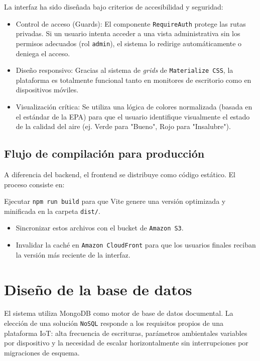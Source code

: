 La interfaz ha sido diseñada bajo criterios de accesibilidad y seguridad:

\begin{itemize}
    \item Control de acceso (Guards): El componente \texttt{RequireAuth} protege las rutas privadas. Si un usuario intenta acceder a una vista administrativa sin los permisos adecuados (rol \texttt{admin}), el sistema lo redirige automáticamente o deniega el acceso.
    \item Diseño responsivo: Gracias al sistema de \textit{grids} de \texttt{Materialize CSS}, la plataforma es totalmente funcional tanto en monitores de escritorio como en dispositivos móviles.
    \item Visualización crítica: Se utiliza una lógica de colores normalizada (basada en el estándar de la EPA) para que el usuario identifique visualmente el estado de la calidad del aire (ej. Verde para "Bueno", Rojo para "Insalubre").
\end{itemize}

\subsection{Flujo de compilación para producción}

A diferencia del backend, el frontend se distribuye como código estático. El proceso consiste en:

Ejecutar \texttt{npm run build} para que Vite genere una versión optimizada y minificada en la carpeta \texttt{dist/}.

\begin{itemize}
    \item Sincronizar estos archivos con el bucket de \texttt{Amazon S3}.
    \item Invalidar la caché en \texttt{Amazon CloudFront} para que los usuarios finales reciban la versión más reciente de la interfaz.
\end{itemize}


\section{Diseño de la base de datos}

El sistema utiliza MongoDB como motor de base de datos documental. La elección de una solución \texttt{NoSQL} responde a los requisitos propios de una plataforma IoT: alta frecuencia de escrituras, parámetros ambientales variables por dispositivo y la necesidad de escalar horizontalmente sin interrupciones por migraciones de esquema.

